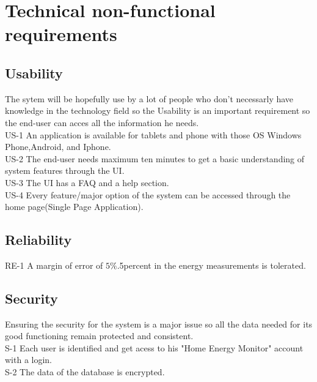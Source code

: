 \section{Technical non-functional requirements}

\subsection{Usability}
The sytem will be hopefully use by a lot of people who don't necessarly have knowledge in the technology field so the Usability is an important requirement so the end-user can acces all the information he needs. \\

US-1 An application is available for tablets and phone with those OS Windows Phone,Android, and Iphone. \\ %
US-2  The end-user needs maximum ten minutes to get a basic understanding of system features through the UI. \\
US-3  The UI has a FAQ and a help section. \\
US-4  Every feature/major option of the system can be accessed through the home page(Single Page Application). \\



\subsection{Reliability}
RE-1 A margin of error of $5\%$.5percent in the energy measurements is tolerated. \\
 
\subsection{Security}
Ensuring the security for the system is a major issue so all the data needed for its good functioning remain protected and consistent. \\

S-1 Each user is identified and get acess to his "Home Energy Monitor" account with a login. \\
S-2 The data of the database is encrypted. \\ %


